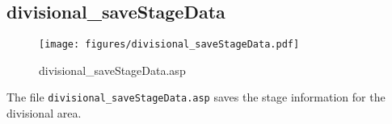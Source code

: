 \subsection{divisional\_saveStageData}
\begin{figure}[htb]
    \begin{center}
        \texttt{[image: figures/divisional\_saveStageData.pdf]}
    \end{center}
    \caption{divisional\_saveStageData.asp}
    \label{fig:divisional_saveStageData}
\end{figure}

The file \verb|divisional_saveStageData.asp| saves the stage information for the
divisional area.
